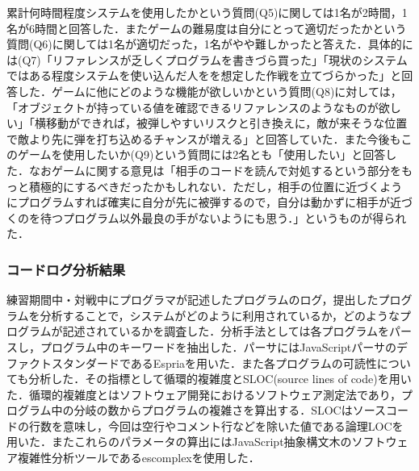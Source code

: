 累計何時間程度システムを使用したかという質問(Q5)に関しては1名が2時間，1名が6時間と回答した．またゲームの難易度は自分にとって適切だったかという質問(Q6)に関しては1名が適切だった，1名がやや難しかったと答えた．具体的には(Q7)「リファレンスが乏しくプログラムを書きづら買った」「現状のシステムではある程度システムを使い込んだ人をを想定した作戦を立てづらかった」と回答した．ゲームに他にどのような機能が欲しいかという質問(Q8)に対しては，「オブジェクトが持っている値を確認できるリファレンスのようなものが欲しい」「横移動ができれば，被弾しやすいリスクと引き換えに，敵が来そうな位置で敵より先に弾を打ち込めるチャンスが増える」と回答していた．また今後もこのゲームを使用したいか(Q9)という質問には2名とも「使用したい」と回答した．なおゲームに関する意見は「相手のコードを読んで対処するという部分をもっと積極的にするべきだったかもしれない．ただし，相手の位置に近づくようにプログラムすれば確実に自分が先に被弾するので，自分は動かずに相手が近づくのを待つプログラム以外最良の手がないようにも思う．」というものが得られた．

\subsubsection{コードログ分析結果}

練習期間中・対戦中にプログラマが記述したプログラムのログ，提出したプログラムを分析することで，システムがどのように利用されているか，どのようなプログラムが記述されているかを調査した．分析手法としては各プログラムをパースし，プログラム中のキーワードを抽出した．パーサにはJavaScriptパーサのデファクトスタンダードであるEspria\cite{esprima}を用いた．また各プログラムの可読性についても分析した．その指標として循環的複雑度とSLOC(source lines of code)を用いた．循環的複雑度とはソフトウェア開発におけるソフトウェア測定法であり，プログラム中の分岐の数からプログラムの複雑さを算出する．SLOCはソースコードの行数を意味し，今回は空行やコメント行などを除いた値である論理LOCを用いた．またこれらのパラメータの算出にはJavaScript抽象構文木のソフトウェア複雑性分析ツールであるescomplex\cite{escomplex}を使用した．

